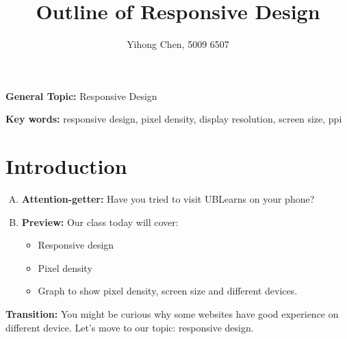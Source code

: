 \documentclass{article}
\title{Outline of Responsive Design}
\author{Yihong Chen, 5009 6507}
\begin{document}
\maketitle

\noindent \textbf{General Topic:} Responsive Design

\noindent \textbf{Key words:} responsive design, pixel density, display resolution, screen size, ppi

\section{Introduction}
\begin{enumerate}[A.]
\item \textbf{Attention-getter:} Have you tried to visit UBLearns on your phone?
\item \textbf{Preview:} Our class today will cover:
  \begin{itemize}
  \item Responsive design
  \item Pixel density
  \item Graph to show pixel density, screen size and different devices.
  \end{itemize}
\end{enumerate}
\textbf{Transition:} You might be curious why some websites have good experience on different device. Let's move to our topic: responsive design.
\end{document}
